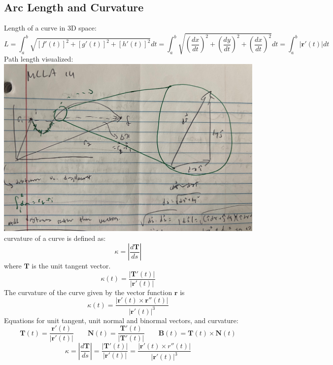 \documentclass{article}
\begin{document}
    \subsection{Arc Length and Curvature}
    \begin{outline}
        \1 Length of a curve in 3D space: \[L=\int^b_a\sqrt{[f'(t)]^2+[g'(t)]^2+[h'(t)]^2}dt=\int^b_a\sqrt{\left(\dfrac{dx}{dt}\right)^2+\left(\dfrac{dy}{dt}\right)^2+\left(\dfrac{dx}{dt}\right)^2}dt=\int^b_a|\mathbf r'(t)|dt\]
        \1 Path length visualized: \\\includegraphics[scale=0.1]{path-length.jpg}
        \1 curvature of a curve is defined as: \[\kappa=\left|\dfrac{d\mathbf T}{ds}\right|\] where $\mathbf T$ is the unit tangent vector. 
        \1 \[\kappa(t)=\dfrac{|\mathbf T'(t)|}{|\mathbf r'(t)|}\]
        \1 The curvature of the curve given by the vector function $\mathbf r$ is \[\kappa(t)=\dfrac{|\mathbf r'(t)\times\mathbf r''(t)|}{|\mathbf r'(t)|^3}\]
        \1 Equations for unit tangent, unit normal and binormal vectors, and curvature: \[\mathbf T(t)=\dfrac{\mathbf r'(t)}{|\mathbf r'(t)|}\qquad \mathbf N(t)=\dfrac{\mathbf T'(t)}{|\mathbf T'(t)|}\qquad \mathbf B(t)=\mathbf T(t)\times\mathbf N(t)\]\[\kappa=\left|\dfrac{d\mathbf T}{ds}\right|=\dfrac{|\mathbf T'(t)|}{|\mathbf r'(t)|}=\dfrac{|\mathbf r'(t)\times r''(t)|}{|\mathbf r'(t)|^3}\]

\end{outline}
\end{document}
